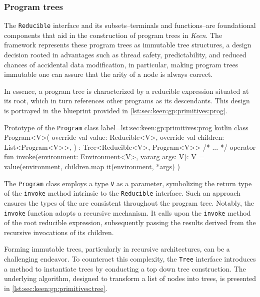 
\subsubsection{Program trees}
    The \texttt{Reducible} interface and its subsets--terminals and functions--are foundational components that aid in 
    the construction of program trees in \textit{Keen}. The framework represents these program trees as immutable tree 
    structures, a design decision rooted in advantages such as thread safety, predictability, and reduced chances of 
    accidental data modification, in particular, making program trees immutable one can assure that the arity of a node 
    is always correct.

    In essence, a program tree is characterized by a reducible expression situated at its root, which in turn references 
    other programs as its descendants. This design is portrayed in the blueprint provided in 
    \vref{lst:sec:keen:gp:primitives:prog}.

    \begin{code}{Prototype of the \texttt{Program} class}{
        label=lst:sec:keen:gp:primitives:prog
    }{kotlin}
        class Program<V>(
            override val value: Reducible<V>,
            override val children: List<Program<V>>,
        ) : Tree<Reducible<V>, Program<V>> {
            /* ... */
            operator fun invoke(environment: Environment<V>, vararg args: V): V =
                value(environment, children.map { it(environment, *args) })
        }
    \end{code}

    The \texttt{Program} class employs a type \texttt{V} as a parameter, symbolizing the return type of the 
    \texttt{invoke} method intrinsic to the \texttt{Reducible} interface. Such an approach ensures the types of the
    are consistent throughout the program tree. Notably, the \texttt{invoke} function adopts a recursive mechanism. It 
    calls upon the \texttt{invoke} method of the root reducible expression, subsequently passing the results derived 
    from the recursive invocations of its children.

    Forming immutable trees, particularly in recursive architectures, can be a challenging endeavor. To counteract this 
    complexity, the \texttt{Tree} interface introduces a method to instantiate trees by conducting a top down tree 
    construction. The underlying algorithm, designed to transform a list of nodes into trees, is presented in 
    \vref{lst:sec:keen:gp:primitives:tree}.

